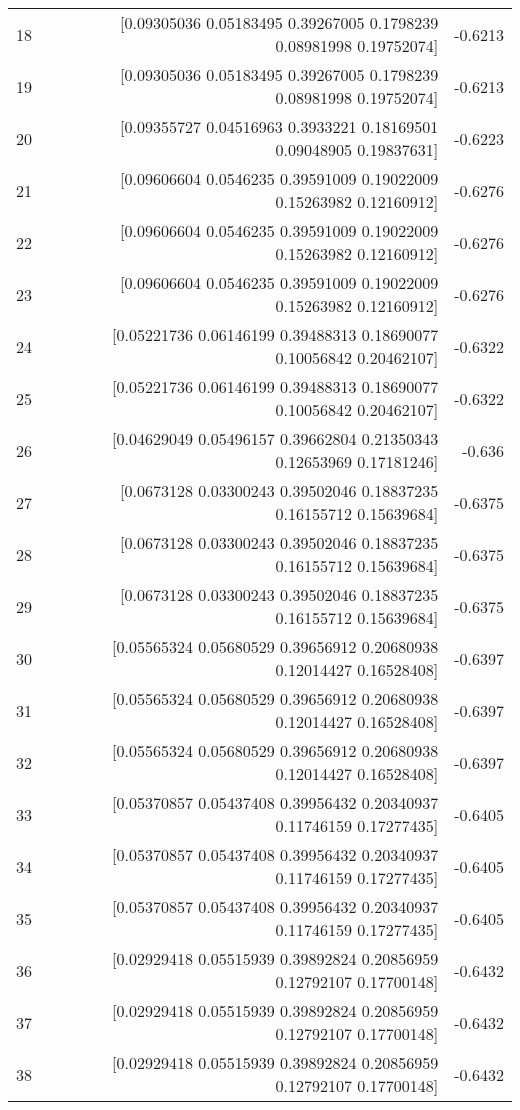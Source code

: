\begin{longtable}{lrr}
18 & [0.09305036 0.05183495 0.39267005 0.1798239  0.08981998 0.19752074] & -0.6213 \\
19 & [0.09305036 0.05183495 0.39267005 0.1798239  0.08981998 0.19752074] & -0.6213 \\
20 & [0.09355727 0.04516963 0.3933221  0.18169501 0.09048905 0.19837631] & -0.6223 \\
21 & [0.09606604 0.0546235  0.39591009 0.19022009 0.15263982 0.12160912] & -0.6276 \\
22 & [0.09606604 0.0546235  0.39591009 0.19022009 0.15263982 0.12160912] & -0.6276 \\
23 & [0.09606604 0.0546235  0.39591009 0.19022009 0.15263982 0.12160912] & -0.6276 \\
24 & [0.05221736 0.06146199 0.39488313 0.18690077 0.10056842 0.20462107] & -0.6322 \\
25 & [0.05221736 0.06146199 0.39488313 0.18690077 0.10056842 0.20462107] & -0.6322 \\
26 & [0.04629049 0.05496157 0.39662804 0.21350343 0.12653969 0.17181246] & -0.636 \\
27 & [0.0673128  0.03300243 0.39502046 0.18837235 0.16155712 0.15639684] & -0.6375 \\
28 & [0.0673128  0.03300243 0.39502046 0.18837235 0.16155712 0.15639684] & -0.6375 \\
29 & [0.0673128  0.03300243 0.39502046 0.18837235 0.16155712 0.15639684] & -0.6375 \\
30 & [0.05565324 0.05680529 0.39656912 0.20680938 0.12014427 0.16528408] & -0.6397 \\
31 & [0.05565324 0.05680529 0.39656912 0.20680938 0.12014427 0.16528408] & -0.6397 \\
32 & [0.05565324 0.05680529 0.39656912 0.20680938 0.12014427 0.16528408] & -0.6397 \\
33 & [0.05370857 0.05437408 0.39956432 0.20340937 0.11746159 0.17277435] & -0.6405 \\
34 & [0.05370857 0.05437408 0.39956432 0.20340937 0.11746159 0.17277435] & -0.6405 \\
35 & [0.05370857 0.05437408 0.39956432 0.20340937 0.11746159 0.17277435] & -0.6405 \\
36 & [0.02929418 0.05515939 0.39892824 0.20856959 0.12792107 0.17700148] & -0.6432 \\
37 & [0.02929418 0.05515939 0.39892824 0.20856959 0.12792107 0.17700148] & -0.6432 \\
38 & [0.02929418 0.05515939 0.39892824 0.20856959 0.12792107 0.17700148] & -0.6432 \\

\end{longtable}
